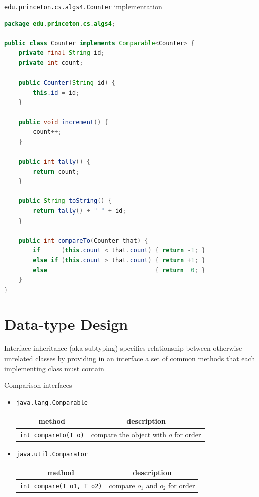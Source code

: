 \documentclass[8pt,a4paper,compress]{beamer}
\begin{document}
\begin{frame}[fragile]
\pause

\lstinline{edu.princeton.cs.algs4.Counter} implementation
\begin{lstlisting}[language=Java]
package edu.princeton.cs.algs4;

public class Counter implements Comparable<Counter> {
    private final String id;
    private int count;

    public Counter(String id) { 
        this.id = id; 
    }

    public void increment() { 
        count++; 
    }

    public int tally() { 
        return count; 
    }

    public String toString() { 
        return tally() + " " + id; 
    }
    
    public int compareTo(Counter that) {
        if      (this.count < that.count) { return -1; }
        else if (this.count > that.count) { return +1; }
        else                              { return  0; }
    }
}
\end{lstlisting}
\end{frame}

\section{Data-type Design}
\begin{frame}[fragile]
\pause

Interface inheritance (aka subtyping) specifies relationship between otherwise unrelated classes by providing in an interface a set of common methods that each implementing class must contain

\pause
\bigskip

Comparison interfaces
\begin{itemize}
\item \lstinline{java.lang.Comparable}
\begin{center}
\begin{tabular}{cc}
method & description \\ \hline
\lstinline$int compareTo(T o)$ & compare the object with $o$ for order
\end{tabular} 
\end{center}

\item \lstinline{java.util.Comparator}
\begin{center}
\begin{tabular}{cc}
method & description \\ \hline
\lstinline$int compare(T o1, T o2)$ & compare $o_1$ and $o_2$ for order
\end{tabular} 
\end{center}
\end{itemize}
\end{frame}
\end{document}
